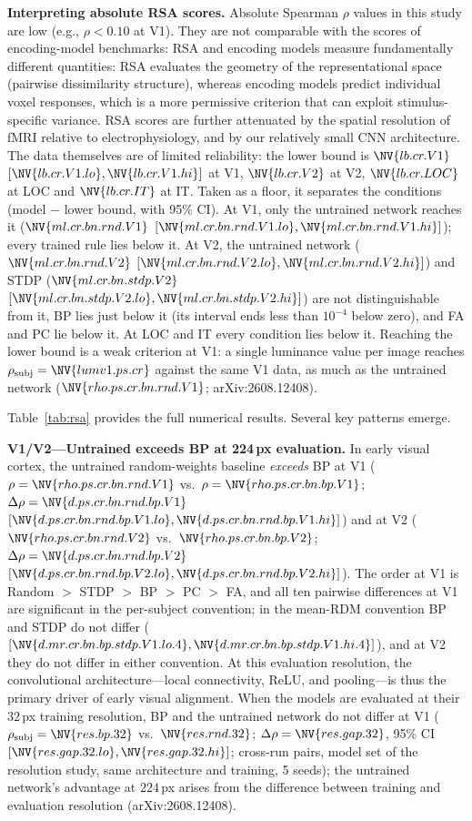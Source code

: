 \documentclass[10pt,twocolumn]{article}
\newcommand{\newid}{arXiv:2608.12408}
\newcommand{\rs}[2]{\NV{rho.ps.cr.bn.#1.#2}}
\newcommand{\dps}[3]{\NV{d.ps.cr.bn.#1.#2.#3}}
\newcommand{\dpsci}[3]{[\NV{d.ps.cr.bn.#1.#2.#3.lo},\NV{d.ps.cr.bn.#1.#2.#3.hi}]}
\newcommand{\dmrciF}[3]{[\NV{d.mr.cr.bn.#1.#2.#3.lo.4},\NV{d.mr.cr.bn.#1.#2.#3.hi.4}]}
\newcommand{\lb}[1]{\NV{lb.cr.#1}}
\newcommand{\lbci}[1]{[\NV{lb.cr.#1.lo},\NV{lb.cr.#1.hi}]}
\newcommand{\ml}[2]{\NV{ml.cr.bn.#1.#2}}
\newcommand{\mlci}[2]{[\NV{ml.cr.bn.#1.#2.lo},\NV{ml.cr.bn.#1.#2.hi}]}
\begin{document}
\textbf{Interpreting absolute RSA scores.} Absolute Spearman $\rho$ values in this study are low (e.g., $\rho < 0.10$ at V1). They are not comparable with the scores of encoding-model benchmarks: RSA and encoding models measure fundamentally different quantities: RSA evaluates the geometry of the representational space (pairwise dissimilarity structure), whereas encoding models predict individual voxel responses, which is a more permissive criterion that can exploit stimulus-specific variance. RSA scores are further attenuated by the spatial resolution of fMRI relative to electrophysiology, and by our relatively small CNN architecture. The data themselves are of limited reliability: the lower bound is $\lb{V1}$ $\lbci{V1}$ at V1, $\lb{V2}$ at V2, $\lb{LOC}$ at LOC and $\lb{IT}$ at IT. Taken as a floor, it separates the conditions (model $-$ lower bound, with 95\% CI). At V1, only the untrained network reaches it ($\ml{rnd}{V1}$ $\mlci{rnd}{V1}$); every trained rule lies below it. At V2, the untrained network ($\ml{rnd}{V2}$ $\mlci{rnd}{V2}$) and STDP ($\ml{stdp}{V2}$ $\mlci{stdp}{V2}$) are not distinguishable from it, BP lies just below it (its interval ends less than $10^{-4}$ below zero), and FA and PC lie below it. At LOC and IT every condition lies below it. Reaching the lower bound is a weak criterion at V1: a single luminance value per image reaches $\rho_{\text{subj}} = \NV{lumv1.ps.cr}$ against the same V1 data, as much as the untrained network ($\rs{rnd}{V1}$; \newid).

Table~\ref{tab:rsa} provides the full numerical results. Several key patterns emerge.

\textbf{V1/V2---Untrained exceeds BP at 224\,px evaluation.} In early visual cortex, the untrained random-weights baseline \emph{exceeds} BP at V1 ($\rho = \rs{rnd}{V1}$ vs.\ $\rho = \rs{bp}{V1}$; $\Delta\rho = \dps{rnd}{bp}{V1}$ $\dpsci{rnd}{bp}{V1}$) and at V2 ($\rs{rnd}{V2}$ vs.\ $\rs{bp}{V2}$; $\Delta\rho = \dps{rnd}{bp}{V2}$ $\dpsci{rnd}{bp}{V2}$). The order at V1 is Random $>$ STDP $>$ BP $>$ PC $>$ FA, and all ten pairwise differences at V1 are significant in the per-subject convention; in the mean-RDM convention BP and STDP do not differ ($\dmrciF{bp}{stdp}{V1}$), and at V2 they do not differ in either convention. At this evaluation resolution, the convolutional architecture---local connectivity, ReLU, and pooling---is thus the primary driver of early visual alignment. When the models are evaluated at their $32$\,px training resolution, BP and the untrained network do not differ at V1 ($\rho_{\text{subj}} = \NV{res.bp.32}$ vs.\ $\NV{res.rnd.32}$; $\Delta\rho = \NV{res.gap.32}$, 95\% CI $[\NV{res.gap.32.lo},\NV{res.gap.32.hi}]$; cross-run pairs, model set of the resolution study, same architecture and training, 5 seeds); the untrained network's advantage at $224$\,px arises from the difference between training and evaluation resolution (\newid).
\end{document}
